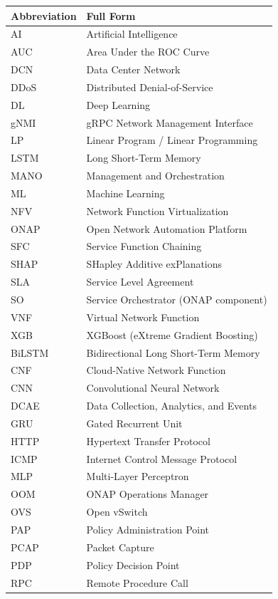 \documentclass[12pt, a4paper, reqno, oneside]{book}
\begin{document}
\begin{table}[H]
\centering
\begin{tabular}{|m{3cm}|m{9cm}|}
\hline
\textbf{Abbreviation} & \textbf{Full Form} \\ \hline
AI    & Artificial Intelligence \\ \hline
AUC   & Area Under the ROC Curve  \\ \hline
DCN   & Data Center Network \\ \hline
DDoS  & Distributed Denial-of-Service  \\ \hline
DL    & Deep Learning \\ \hline
gNMI  & gRPC Network Management Interface \\ \hline
LP    & Linear Program / Linear Programming \\ \hline
LSTM  & Long Short-Term Memory \\ \hline
MANO  & Management and Orchestration \\ \hline
ML    & Machine Learning \\ \hline
NFV   & Network Function Virtualization \\ \hline
ONAP  & Open Network Automation Platform \\ \hline
SFC   & Service Function Chaining \\ \hline
SHAP  & SHapley Additive exPlanations \\ \hline
SLA   & Service Level Agreement \\ \hline
SO    & Service Orchestrator (ONAP component) \\ \hline
VNF   & Virtual Network Function \\ \hline
XGB   & XGBoost (eXtreme Gradient Boosting) \\ \hline
BiLSTM & Bidirectional Long Short-Term Memory \\ \hline
CNF & Cloud-Native Network Function \\ \hline
CNN & Convolutional Neural Network \\ \hline
DCAE & Data Collection, Analytics, and Events \\ \hline
GRU & Gated Recurrent Unit \\ \hline
HTTP & Hypertext Transfer Protocol \\ \hline
ICMP & Internet Control Message Protocol \\ \hline
MLP & Multi-Layer Perceptron \\ \hline
OOM & ONAP Operations Manager \\ \hline
OVS & Open vSwitch \\ \hline
PAP & Policy Administration Point \\ \hline
PCAP & Packet Capture \\ \hline
PDP & Policy Decision Point \\ \hline
RPC & Remote Procedure Call \\ \hline
\end{tabular}
\end{table}
\end{document}
